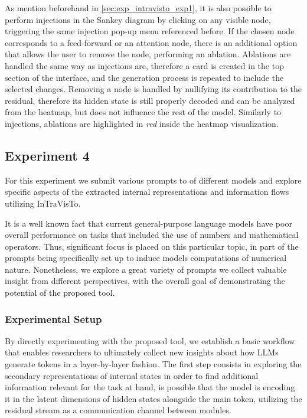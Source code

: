 As mention beforehand in \cref{sec:exp_intravisto_exp1}, it is also possible to perform injections in the Sankey diagram by clicking on any visible node, triggering the same injection pop-up menu referenced before.
If the chosen node corresponds to a feed-forward  or an attention node, there is an additional option that allows the user to remove the node, performing an ablation.
Ablations are handled the same way as injections are, therefore a card is created in the top section of the interface, and the generation process is repeated to include the selected changes.
Removing a node is handled by nullifying its contribution to the residual, therefore its hidden state is still properly decoded and can be analyzed from the heatmap, but does not influence the rest of the model.
Similarly to injections, ablations are highlighted in \emph{red} inside the heatmap visualization.

\subsection{Experiment 4}\label{sec:exp_intravisto_exp4}

For this experiment we submit various prompts to  of different models and explore specific aspects of the extracted internal representations and information flows utilizing InTraVisTo.

It is a well known fact that current general-purpose language models have  poor overall performance on tasks that included the use of numbers and mathematical operators.
Thus, significant focus is placed on this particular topic,  in part of the prompts being specifically set up to induce models  computations of numerical nature.
Nonetheless, we explore a great variety of prompts  we collect valuable insight from different perspectives, with the overall goal of demonstrating the potential of the proposed tool.

\subsubsection{Experimental Setup}\label{sssec:exp_intravisto_exp4_expset}

By directly experimenting with the proposed tool, we establish a basic workflow that enables researchers to ultimately collect new insights about how LLMs generate tokens in a layer-by-layer fashion.
The first step consists in exploring the secondary representations of internal states in order to find additional information relevant for the task at hand,  is possible that the model is encoding it in the latent dimensions of hidden states alongside the main token, utilizing the residual stream as a communication channel between modules.

